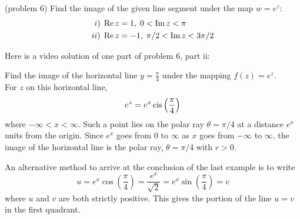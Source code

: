 \documentclass[handout]{ximera}
\begin{document}
\begin{problem}(problem 6)
Find the image of the given line segment under the map $w = e^z$:
\begin{align*}
i)\; & \operatorname{Re} z = 1,\; 0<\operatorname{Im} z < \pi \\
ii)\; & \operatorname{Re} z = -1,\; \pi/2 < \operatorname{Im} z < 3\pi/2
\end{align*}
\end{problem}

Here is a video solution of one part of problem 6, part ii:\\
\begin{foldable}
\end{foldable}

\begin{example}[example 7]
Find the image of the horizontal line $y = \frac{\pi}{4}$ under the mapping $f(z) = e^z$.\\
For $z$ on this horizontal line, 
\[
e^z = e^x \operatorname{cis} \left(\frac{\pi}{4}\right)
\]
where $-\infty < x < \infty$. Such a point lies on the polar ray $\theta = \pi/4$ at a distance $e^x$ units from the origin.
Since $e^x$ goes from $0$ to $\infty$ as $x$ goes from $-\infty$ to $\infty$, the image of the horizontal line is the polar
ray, $\theta = \pi/4$ with $r>0$.

\begin{image}
\end{image}
An alternative method to arrive at the conclusion of the last example is to write
\[
u = e^x\cos\left(\frac{\pi}{4}\right) = \frac{e^x}{\sqrt 2} = e^x\sin\left(\frac{\pi}{4}\right) = v
\]
where $u$ and $v$ are both strictly positive. This gives the portion of the line $u = v$ in the first quadrant.

\end{example}
\end{document}
